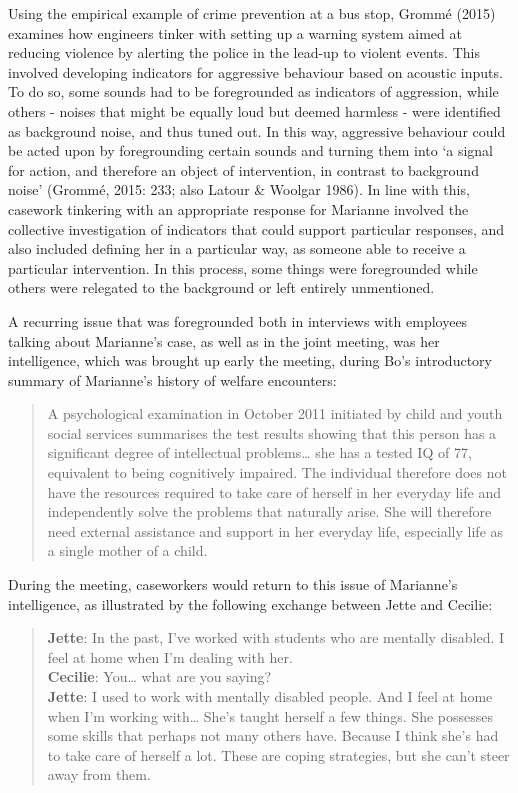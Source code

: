 Using the empirical example of crime prevention at a bus stop, Grommé (2015) examines how engineers tinker with setting up a warning system aimed at reducing violence by alerting the police in the lead-up to violent events. This involved developing indicators for aggressive behaviour based on acoustic inputs. To do so, some sounds had to be foregrounded as indicators of aggression, while others - noises that might be equally loud but deemed harmless - were identified as background noise, and thus tuned out. In this way, aggressive behaviour could be acted upon by foregrounding certain sounds and turning them into ‘a signal for action, and therefore an object of intervention, in contrast to background noise’ (Grommé, 2015: 233; also Latour \& Woolgar 1986). In line with this, casework tinkering with an appropriate response for Marianne involved the collective investigation of indicators that could support particular responses, and also included defining her in a particular way, as someone able to receive a particular intervention. In this process, some things were foregrounded while others were relegated to the background or left entirely unmentioned.
\par
A recurring issue that was foregrounded both in interviews with employees talking about Marianne’s case, as well as in the joint meeting, was her intelligence, which was brought up early the meeting, during Bo’s introductory summary of Marianne’s history of welfare encounters:
    \blockquote{A psychological examination in October 2011 initiated by child and youth social services summarises the test results showing that this person has a significant degree of intellectual problems… she has a tested IQ of 77, equivalent to being cognitively impaired. The individual therefore does not have the resources required to take care of herself in her everyday life and independently solve the problems that naturally arise. She will therefore need external assistance and support in her everyday life, especially life as a single mother of a child.}
During the meeting, caseworkers would return to this issue of Marianne’s intelligence, as illustrated by the following exchange between Jette and Cecilie:
    \blockquote{\textnormal{\bfseries Jette}:	In the past, I’ve worked with students who are mentally disabled. I feel at home when I’m dealing with her.
    \\\textnormal{\bfseries Cecilie}: 	You… what are you saying?
    \\\textnormal{\bfseries Jette}: 	I used to work with mentally disabled people. And I feel at home when I’m working with… She’s taught herself a few things. She possesses some skills that perhaps not many others have. Because I think she’s had to take care of herself a lot. These are coping strategies, but she can’t steer away from them.}
